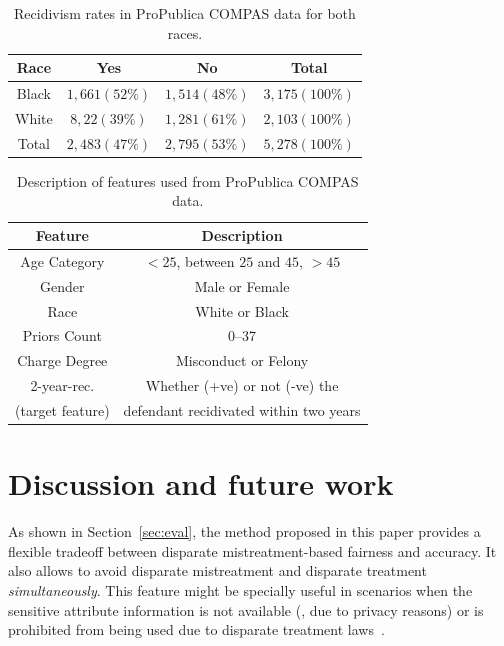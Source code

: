 \documentclass[letterpaper]{sig-alternate-2013}
\newcommand{\disc}{disparate mistreatment}
\begin{document}
\begin{table}
\centering
\begin{tabular}{c|c|c|c}
\hline
Race  &  Yes        & No        & Total \\ \hline
Black &  $ 1,661 (52\%)  $ & $ 1,514 (48\%)$ &  $ 3,175 (100\%)$ \\
White &  $ 8,22  (39\%) $  & $1,281  (61\%)$ &  $ 2,103 (100\%)$ \\ \hline
Total &  $ 2,483 (47\%) $  & $2,795  (53\%)$ &  $ 5,278 (100\%)$ \\\hline
\end{tabular}
\caption{Recidivism rates in ProPublica COMPAS data for both races.} \label{table:compas-stats}
\vspace{3mm}
\end{table}

\begin{table}
\centering
\begin{tabular}{c|c}
\hline
Feature  &  Description \\ \hline
Age Category &  $<25$, between $25$ and $45$, $>45$ \\
Gender &  Male or Female \\
Race &  White or Black \\
Priors Count &  0--37 \\
Charge Degree &  Misconduct or Felony \\
\hline
2-year-rec. & Whether (+ve) or not (-ve) the  \\
(target feature)  & defendant recidivated within two years
\end{tabular}
\caption{Description of features used from ProPublica COMPAS data.} \label{table:compas-features}
\end{table}


\section{Discussion and future work}
\noindent
As shown in Section~\ref{sec:eval}, the method proposed in this paper provides a flexible tradeoff between disparate mistreatment-based fairness and accuracy.
It also allows to avoid \disc{} and disparate treatment \textit{simultaneously}. This feature might be specially
useful in scenarios when the sensitive attribute information is not available (\eg, due to privacy reasons) or is prohibited from being
used due to disparate treatment laws~\cite{barocas_2016}.
\end{document}

